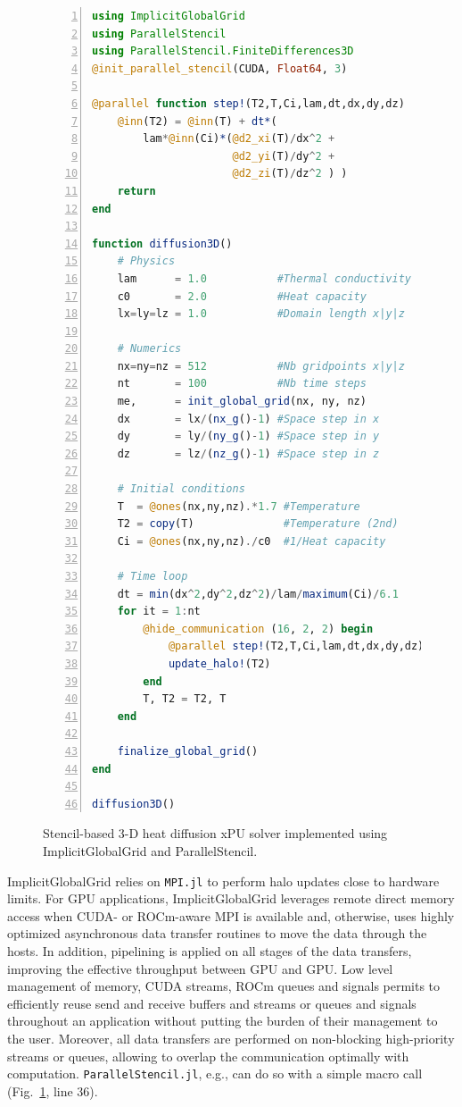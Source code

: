 \documentclass{juliacon}
\begin{document}
\begin{figure}[t]
\begin{lstlisting}[language = Julia, numbers=left, numberstyle=\tiny\color{gray}]
using ImplicitGlobalGrid
using ParallelStencil
using ParallelStencil.FiniteDifferences3D
@init_parallel_stencil(CUDA, Float64, 3)

@parallel function step!(T2,T,Ci,lam,dt,dx,dy,dz)
    @inn(T2) = @inn(T) + dt*(
        lam*@inn(Ci)*(@d2_xi(T)/dx^2 + 
                      @d2_yi(T)/dy^2 + 
                      @d2_zi(T)/dz^2 ) )
    return
end

function diffusion3D()
    # Physics
    lam      = 1.0           #Thermal conductivity
    c0       = 2.0           #Heat capacity
    lx=ly=lz = 1.0           #Domain length x|y|z

    # Numerics
    nx=ny=nz = 512           #Nb gridpoints x|y|z
    nt       = 100           #Nb time steps
    me,      = init_global_grid(nx, ny, nz)
    dx       = lx/(nx_g()-1) #Space step in x
    dy       = ly/(ny_g()-1) #Space step in y
    dz       = lz/(nz_g()-1) #Space step in z

    # Initial conditions
    T  = @ones(nx,ny,nz).*1.7 #Temperature
    T2 = copy(T)              #Temperature (2nd)
    Ci = @ones(nx,ny,nz)./c0  #1/Heat capacity

    # Time loop
    dt = min(dx^2,dy^2,dz^2)/lam/maximum(Ci)/6.1
    for it = 1:nt
        @hide_communication (16, 2, 2) begin
            @parallel step!(T2,T,Ci,lam,dt,dx,dy,dz)
            update_halo!(T2)
        end
        T, T2 = T2, T
    end

    finalize_global_grid()
end

diffusion3D()

\end{lstlisting}

    \caption{Stencil-based 3-D heat diffusion xPU solver implemented using ImplicitGlobalGrid and ParallelStencil.}
	\label{fig:code}
\end{figure}


ImplicitGlobalGrid relies on \texttt{MPI.jl} \cite{byrne2021mpi} to perform halo updates close to hardware limits. For GPU applications, ImplicitGlobalGrid leverages remote direct memory access when CUDA- or ROCm-aware MPI is available and, otherwise, uses highly optimized asynchronous data transfer routines to move the data through the hosts. In addition, pipelining is applied on all stages of the data transfers, improving the effective throughput between GPU and GPU. Low level management of memory, CUDA streams, ROCm queues and signals permits to efficiently reuse send and receive buffers and streams or queues and signals throughout an application without putting the burden of their management to the user. Moreover, all data transfers are performed on non-blocking high-priority streams or queues, allowing to overlap the communication optimally with computation. \texttt{ParallelStencil.jl}, e.g., can do so with a simple macro call (Fig.~\ref{fig:code}, line 36).
\end{document}
